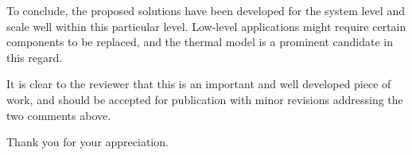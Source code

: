\begin{authors}
To conclude, the proposed solutions have been developed for the system level
and scale well within this particular level. Low-level applications might
require certain components to be replaced, and the thermal model is a prominent
candidate in this regard.

\begin{actions}
\end{actions}
\end{authors}

\begin{reviewer}
It is clear to the reviewer that this is an important and well developed
piece of work, and should be accepted for publication with minor revisions
addressing the two comments above.
\end{reviewer}

\begin{authors}
  Thank you for your appreciation.
\end{authors}
